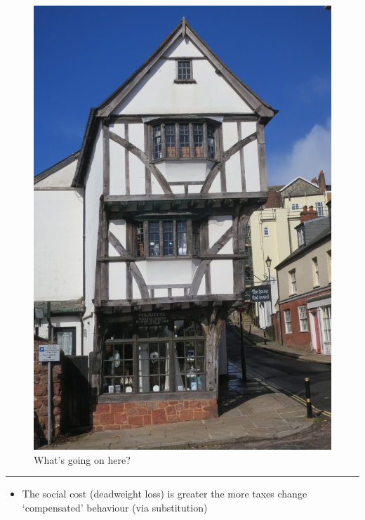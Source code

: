 \documentclass[]{article}
\providecommand{\tightlist}{%
  \setlength{\itemsep}{0pt}\setlength{\parskip}{0pt}}
\begin{document}
\begin{figure}
\centering
\includegraphics{picsfigs/tudoroverhang.jpg}
\caption{What's going on here?}
\end{figure}


\begin{center}\rule{0.5\linewidth}{\linethickness}\end{center}

\begin{itemize}
\tightlist
\item
  The social cost (deadweight loss) is greater the more taxes change
  `compensated' behaviour (via substitution)
\end{itemize}
\end{document}
